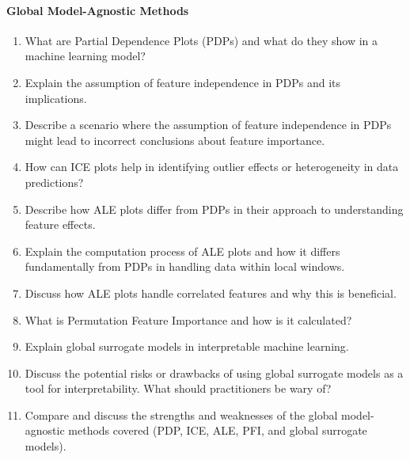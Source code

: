 \paragraph*{Global Model-Agnostic Methods}
\begin{enumerate}
    \item What are Partial Dependence Plots (PDPs) and what do they show in a machine learning model?
    \item Explain the assumption of feature independence in PDPs and its implications.
    \item Describe a scenario where the assumption of feature independence in PDPs might lead to incorrect conclusions about feature importance.
    \item How can ICE plots help in identifying outlier effects or heterogeneity in data predictions?
    \item Describe how ALE plots differ from PDPs in their approach to understanding feature effects.
    \item Explain the computation process of ALE plots and how it differs fundamentally from PDPs in handling data within local windows.
    \item Discuss how ALE plots handle correlated features and why this is beneficial.
    \item What is Permutation Feature Importance and how is it calculated?
    \item Explain global surrogate models in interpretable machine learning.
    \item Discuss the potential risks or drawbacks of using global surrogate models as a tool for interpretability. What should practitioners be wary of?
    \item Compare and discuss the strengths and weaknesses of the global model-agnostic methods covered (PDP, ICE, ALE, PFI, and global surrogate models).
\end{enumerate}
